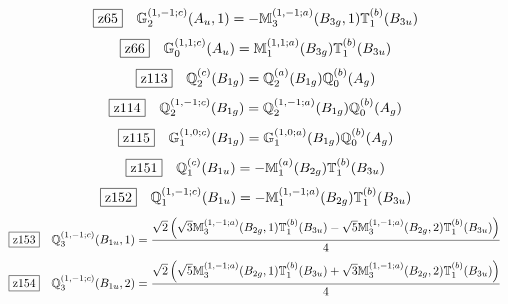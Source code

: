\documentclass[fleqn,10pt,landscape]{jsarticle}
\begin{document}
\begin{dmath*}
\hspace*{3mm}\fbox{z65}\quad \mathbb{G}_{2}^{(1,-1;c)}(A_{u},1)=- \mathbb{M}_{3}^{(1,-1;a)}(B_{3g},1) \mathbb{T}_{1}^{(b)}(B_{3u})
\end{dmath*}
\begin{dmath*}
\hspace*{3mm}\fbox{z66}\quad \mathbb{G}_{0}^{(1,1;c)}(A_{u})=\mathbb{M}_{1}^{(1,1;a)}(B_{3g}) \mathbb{T}_{1}^{(b)}(B_{3u})
\end{dmath*}
\begin{dmath*}
\hspace*{3mm}\fbox{z113}\quad \mathbb{Q}_{2}^{(c)}(B_{1g})=\mathbb{Q}_{2}^{(a)}(B_{1g}) \mathbb{Q}_{0}^{(b)}(A_{g})
\end{dmath*}
\begin{dmath*}
\hspace*{3mm}\fbox{z114}\quad \mathbb{Q}_{2}^{(1,-1;c)}(B_{1g})=\mathbb{Q}_{2}^{(1,-1;a)}(B_{1g}) \mathbb{Q}_{0}^{(b)}(A_{g})
\end{dmath*}
\begin{dmath*}
\hspace*{3mm}\fbox{z115}\quad \mathbb{G}_{1}^{(1,0;c)}(B_{1g})=\mathbb{G}_{1}^{(1,0;a)}(B_{1g}) \mathbb{Q}_{0}^{(b)}(A_{g})
\end{dmath*}
\begin{dmath*}
\hspace*{3mm}\fbox{z151}\quad \mathbb{Q}_{1}^{(c)}(B_{1u})=- \mathbb{M}_{1}^{(a)}(B_{2g}) \mathbb{T}_{1}^{(b)}(B_{3u})
\end{dmath*}
\begin{dmath*}
\hspace*{3mm}\fbox{z152}\quad \mathbb{Q}_{1}^{(1,-1;c)}(B_{1u})=- \mathbb{M}_{1}^{(1,-1;a)}(B_{2g}) \mathbb{T}_{1}^{(b)}(B_{3u})
\end{dmath*}
\begin{dmath*}
\hspace*{3mm}\fbox{z153}\quad \mathbb{Q}_{3}^{(1,-1;c)}(B_{1u},1)=\frac{\sqrt{2} \left(\sqrt{3} \mathbb{M}_{3}^{(1,-1;a)}(B_{2g},1) \mathbb{T}_{1}^{(b)}(B_{3u}) - \sqrt{5} \mathbb{M}_{3}^{(1,-1;a)}(B_{2g},2) \mathbb{T}_{1}^{(b)}(B_{3u})\right)}{4}
\end{dmath*}
\begin{dmath*}
\hspace*{3mm}\fbox{z154}\quad \mathbb{Q}_{3}^{(1,-1;c)}(B_{1u},2)=\frac{\sqrt{2} \left(\sqrt{5} \mathbb{M}_{3}^{(1,-1;a)}(B_{2g},1) \mathbb{T}_{1}^{(b)}(B_{3u}) + \sqrt{3} \mathbb{M}_{3}^{(1,-1;a)}(B_{2g},2) \mathbb{T}_{1}^{(b)}(B_{3u})\right)}{4}
\end{dmath*}
\end{document}
